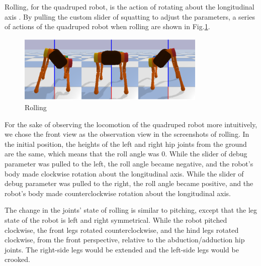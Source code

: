 Rolling, for the quadruped robot, is the action of rotating about the longitudinal axis \cite{ref:6DOF}. By pulling the custom slider of squatting to adjust the parameters, a series of actions of the quadruped robot when rolling are shown in Fig.\ref{fig: rolling}.

\begin{figure}[htbp]
    \centering
    \includegraphics[width=0.8\textwidth]{figures/rolling.png}
    \caption{Rolling}
    \label{fig: rolling}
\end{figure}

For the sake of observing the locomotion of the quadruped robot more intuitively, we chose the front view as the observation view in the screenshots of rolling. In the initial position, the heights of the left and right hip joints from the ground are the same, which means that the roll angle was 0. While the slider of debug parameter was pulled to the left, the roll angle became negative, and the robot's body made clockwise rotation about the longitudinal axis. While the slider of debug parameter was pulled to the right, the roll angle became positive, and the robot's body made counterclockwise rotation about the longitudinal axis.

The change in the joints' state of rolling is similar to pitching, except that the leg state of the robot is left and right symmetrical. While the robot pitched clockwise, the front legs rotated counterclockwise, and the hind legs rotated clockwise, from the front perspective, relative to the abduction/adduction hip joints. The right-side legs would be extended and the left-side legs would be crooked.


